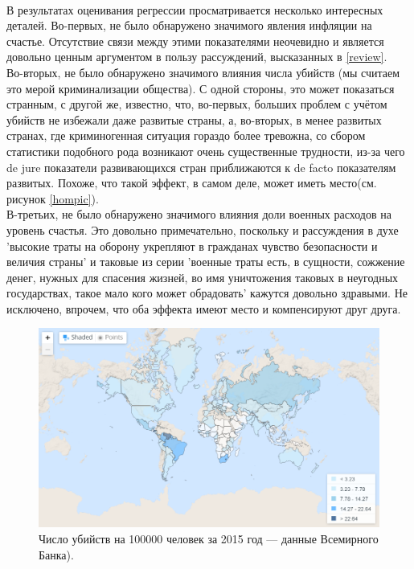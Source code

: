 \documentclass[russian]{vegareport}
\begin{document}
        \\
        В результатах оценивания регрессии просматривается несколько интересных деталей. Во-первых, не было обнаружено значимого явления инфляции на счастье. Отсутствие связи между этими показателями неочевидно и является довольно ценным аргументом в пользу рассуждений, высказанных в \ref{review}.
        \\
        Во-вторых, не было обнаружено значимого влияния числа убийств (мы считаем это мерой криминализации общества). С одной стороны, это может показаться странным, с другой же, известно, что, во-первых, больших проблем с учётом убийств не избежали даже развитые страны, а, во-вторых, в менее развитых странах, где криминогенная ситуация гораздо более тревожна, со сбором статистики подобного рода возникают очень существенные трудности, из-за чего de jure показатели развивающихся стран приближаются к de facto показателям развитых. Похоже, что такой эффект, в самом деле, может иметь место(см. рисунок \ref{hompic}).
        \\
        В-третьих, не было обнаружено значимого влияния доли военных расходов на уровень счастья. Это довольно примечательно, поскольку и рассуждения в духе 'высокие траты на оборону укрепляют в гражданах чувство безопасности и величия страны' и таковые из серии 'военные траты есть, в сущности, сожжение денег, нужных для спасения жизней, во имя уничтожения таковых в неугодных государствах, такое мало кого может обрадовать' кажутся довольно здравыми. Не исключено, впрочем, что оба эффекта имеют место и компенсируют друг друга.
        \\
        \begin{figure} \label{hompic}
            \centering
            \includegraphics[scale=0.45]{Report/homicides.png}
            \caption{Число убийств на 100000 человек за 2015 год --- данные Всемирного Банка).}
            \label{lect02:pic1}
        \end{figure}
\end{document}
